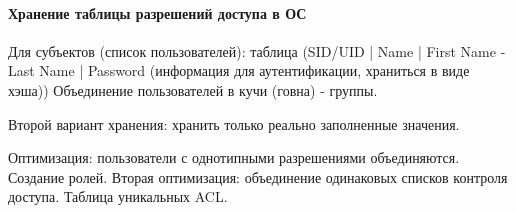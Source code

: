 \documentclass[]{article}
\begin{document}
		\paragraph{Хранение таблицы разрешений доступа в ОС}
		Для субъектов (список пользователей): таблица (SID/UID | Name | First Name - Last Name | Password (информация для аутентификации, храниться в виде хэша)) Объединение пользователей в кучи (говна) - группы.
		
		Второй вариант хранения: хранить только реально заполненные значения.
		
		Оптимизация: пользователи с однотипными разрешениями объединяются. Создание ролей.
		Вторая оптимизация: объединение одинаковых списков контроля доступа. Таблица уникальных ACL. 
\end{document}

